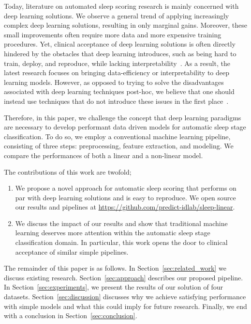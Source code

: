 \documentclass[runningheads]{llncs}
\begin{document}
Today, literature on automated sleep scoring research is mainly concerned with deep learning solutions. We observe a general trend of applying increasingly complex deep learning solutions, resulting in only marginal gains. Moreover, these small improvements often require more data and more expensive training procedures.
Yet, clinical acceptance of deep learning solutions is often directly hindered by the obstacles that deep learning introduces, such as being hard to train, deploy, and reproduce, while lacking interpretability~\cite{fiorillo2019automated,amann2020explainability,fichman2011editorial}. As a result, the latest research focuses on bringing data-efficiency or interpretability to deep learning models.
However, as opposed to trying to solve the disadvantages associated with deep learning techniques post-hoc, we believe that one should instead use techniques that do not introduce these issues in the first place~\cite{rudin2019stop}.

Therefore, in this paper, we challenge the concept that deep learning paradigms are necessary to develop performant data driven models for automatic sleep stage classification. To do so, we employ a conventional machine learning pipeline, consisting of three steps: preprocessing, feature extraction, and modeling. We compare the performances of both a linear and a non-linear model.

The contributions of this work are twofold;
\begin{enumerate}
    \item We propose a novel approach for automatic sleep scoring that performs on par with deep learning solutions and is easy to reproduce. We open source our results and pipelines at \url{https://github.com/predict-idlab/sleep-linear}.
    \item We discuss the impact of our results and show that traditional machine learning deserves more attention within the automatic sleep stage classification domain. In particular, this work opens the door to clinical acceptance of similar simple pipelines.
\end{enumerate}

The remainder of this paper is as follows. In Section~\ref{sec:related_work} we discuss existing research. Section~\ref{sec:approach} describes our proposed pipeline. In Section~\ref{sec:experiments}, we present the results of our solution of four datasets. Section~\ref{sec:discussion} discusses why we achieve satisfying performance with simple models and what this could imply for future research. Finally, we end with a conclusion in Section~\ref{sec:conclusion}.
\end{document}
